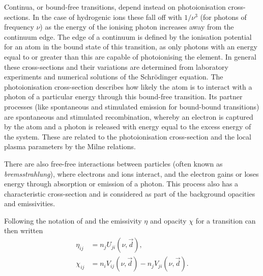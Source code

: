 Continua, or bound-free transitions, depend instead on photoionisation cross-sections.
In the case of hydrogenic ions these fall off with $1/\nu^3$ (for photons of frequency $\nu$) as the energy of the ionising photon increases away from the continuum edge.
The edge of a continuum is defined by the ionisation potential for an atom in the bound state of this transition, as only photons with an energy equal to or greater than this are capable of photoionising the element.
In general these cross-sections and their variations are determined from laboratory experiments and numerical solutions of the Schr\"{o}dinger equation.
The photoionisation cross-section describes how likely the atom is to interact with a photon of a particular energy through this bound-free transition.
Its partner processes (like spontaneous and stimulated emission for bound-bound transitions) are spontaneous and stimulated recombination, whereby an electron is captured by the atom and a photon is released with energy equal to the excess energy of the system.
These are related to the photoionisation cross-section and the local plasma parameters by the Milne relations.

There are also free-free interactions between particles (often known as \emph{bremsstrahlung}), where electrons and ions interact, and the electron gains or loses energy through absorption or emission of a photon.
This process also has a characteristic cross-section and is considered as part of the background opacities and emissivities.

Following the notation of \citet{Rybicki1992} and \citet{Uitenbroek2001} the emissivity $\eta$ and opacity $\chi$ for a transition can then written
\begin{align}
    \label{Eq:Emis}
    \eta_{ij} &= n_j U_{ji}(\nu, \vec{d}), \\
    \label{Eq:Opac}
    \chi_{ij} &= n_i V_{ij}(\nu, \vec{d}) - n_j V_{ji}(\nu, \vec{d}).
\end{align}

